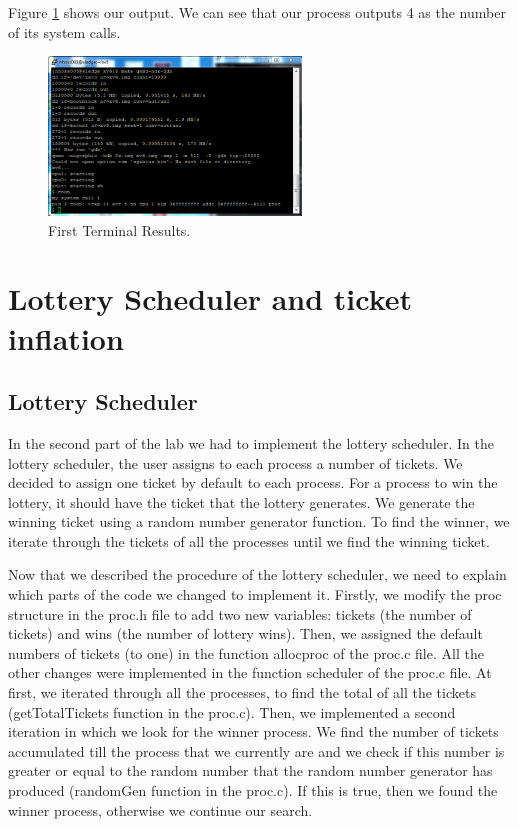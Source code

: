 \documentclass[10pt]{scrartcl}
\begin{document}
Figure \ref{fig:fig1} shows our output.  We can see that our process outputs 4 as the number of its system calls.

\begin{figure}
  \centering
  \includegraphics[width=0.6\textwidth]{fig1.png}
  \caption{First Terminal Results.}\label{fig:fig1}
\end{figure}

\section{Lottery Scheduler and ticket inflation}
\subsection{Lottery Scheduler}
In the second part of the lab we had to implement the lottery scheduler. In the lottery scheduler, the user assigns to each process a number of tickets. We decided to assign one ticket by default to each process. For a process to win the lottery, it should have the ticket that the lottery generates. We generate the winning ticket using a random number generator function. To find the winner, we iterate through the tickets of all the processes until we find the winning ticket. 
\par Now that we described the procedure of the lottery scheduler, we need to explain which parts of the code we changed to implement it. Firstly, we modify the proc structure in the proc.h file to add two new variables: tickets (the number of tickets) and wins (the number of lottery wins). Then, we assigned the default numbers of tickets (to one) in the function allocproc of the proc.c file. All the other changes were implemented in the function scheduler of the proc.c file. At first, we iterated through all the processes, to find the  total of all the tickets (getTotalTickets function in the proc.c). Then, we implemented a second iteration in which we look for the winner process. We find the number of tickets accumulated till the process that we currently are and we check if this number is greater or equal to the random number that the random number generator has produced (randomGen function in the proc.c). If this is true, then we found the winner process, otherwise we continue our search. 
\end{document}
